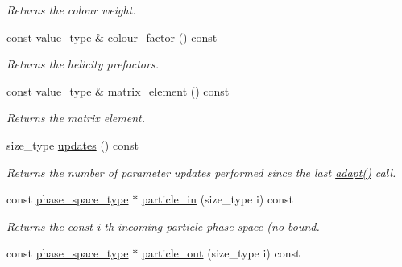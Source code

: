 \begin{DoxyCompactItemize}
\begin{DoxyCompactList}\small\item\em Returns the colour weight. \end{DoxyCompactList}\item 
\hypertarget{a00430_a2ea429e4ea0150b714ce3400cdd0ef7c}{const value\-\_\-type \& \hyperlink{a00430_a2ea429e4ea0150b714ce3400cdd0ef7c}{colour\-\_\-factor} () const }\label{a00430_a2ea429e4ea0150b714ce3400cdd0ef7c}

\begin{DoxyCompactList}\small\item\em Returns the helicity prefactors. \end{DoxyCompactList}\item 
\hypertarget{a00430_a65efe3877d8bd7d3063595edbeb377d0}{const value\-\_\-type \& \hyperlink{a00430_a65efe3877d8bd7d3063595edbeb377d0}{matrix\-\_\-element} () const }\label{a00430_a65efe3877d8bd7d3063595edbeb377d0}

\begin{DoxyCompactList}\small\item\em Returns the matrix element. \end{DoxyCompactList}\item 
size\-\_\-type \hyperlink{a00430_ae23a9709f1f19e1bb8f7109769296b83}{updates} () const 
\begin{DoxyCompactList}\small\item\em Returns the number of parameter updates performed since the last \hyperlink{a00430_a7f97f414b5f3d689efb551aa4f6b1d1c}{adapt()} call. \end{DoxyCompactList}\item 
\hypertarget{a00430_a3203c3acdc1ff32dd2e524e9fa536cf6}{const \hyperlink{a00400}{phase\-\_\-space\-\_\-type} $\ast$ \hyperlink{a00430_a3203c3acdc1ff32dd2e524e9fa536cf6}{particle\-\_\-in} (size\-\_\-type i) const }\label{a00430_a3203c3acdc1ff32dd2e524e9fa536cf6}

\begin{DoxyCompactList}\small\item\em Returns the const i-\/th incoming particle phase space (no bound. \end{DoxyCompactList}\item 
\hypertarget{a00430_a20c6bf03b10a4ea91a9283041168753e}{const \hyperlink{a00400}{phase\-\_\-space\-\_\-type} $\ast$ \hyperlink{a00430_a20c6bf03b10a4ea91a9283041168753e}{particle\-\_\-out} (size\-\_\-type i) const }\label{a00430_a20c6bf03b10a4ea91a9283041168753e}


\end{DoxyCompactItemize}
